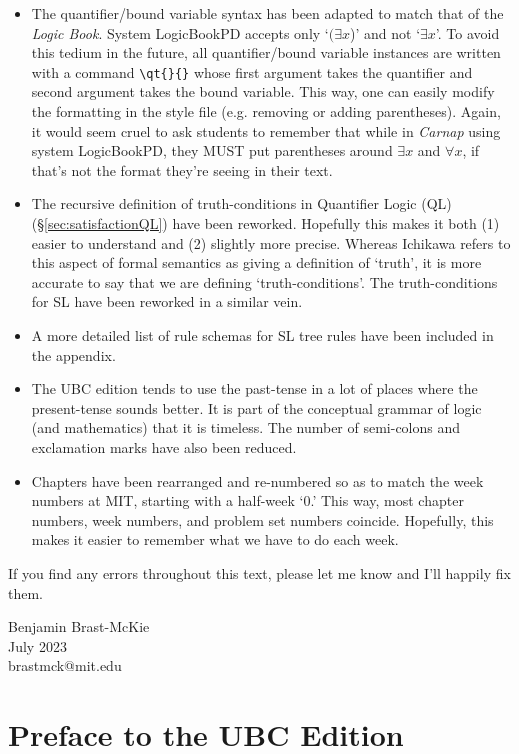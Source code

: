 \begin{itemize}
  \item The quantifier/bound variable syntax has been adapted to match that of the \textit{Logic Book}.
    System LogicBookPD accepts only `$(\exists x$)' and not `$\exists x$'.
    To avoid this tedium in the future, all quantifier/bound variable instances are written with a command \verb|\qt{}{}| whose first argument takes the quantifier and second argument takes the bound variable.
    This way, one can easily modify the formatting in the style file (e.g. removing or adding parentheses).
    Again, it would seem cruel to ask students to remember that while in \textit{Carnap} using system LogicBookPD, they MUST put parentheses around $\exists x$ and $\forall x$, if that's not the format they're seeing in their text.
  \item The recursive definition of truth-conditions in Quantifier Logic (QL) (\S\ref{sec:satisfactionQL}) have been reworked.
    Hopefully this makes it both (1) easier to understand and (2) slightly more precise.
    Whereas Ichikawa refers to this aspect of formal semantics as giving a definition of `truth', it is more accurate to say that we are defining `truth-conditions'.
    The truth-conditions for SL have been reworked in a similar vein.
  \item A more detailed list of rule schemas for SL tree rules have been included in the appendix. 
  \item The UBC edition tends to use the past-tense in a lot of places where the present-tense sounds better.
    It is part of the conceptual grammar of logic (and mathematics) that it is timeless. 
    The number of semi-colons and exclamation marks have also been reduced.
  \item Chapters have been rearranged and re-numbered so as to match the week numbers at MIT, starting with a half-week `0.'
    This way, most chapter numbers, week numbers, and problem set numbers coincide.
    Hopefully, this makes it easier to remember what we have to do each week.
\end{itemize}

If you find any errors throughout this text, please let me know and I'll happily fix them.

\begin{flushright}
Benjamin Brast-McKie \\
July 2023 \\
brastmck@mit.edu
\end{flushright}


\chapter*{Preface to the UBC Edition}
\label{ch.preface}

